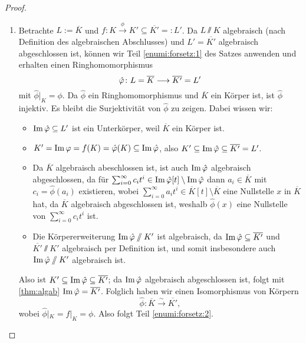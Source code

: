 \documentclass[12pt,a4paper]{scrartcl}
\begin{document}
\begin{proof}
\begin{enumerate}
\begin{itemize}
\begin{proof}[Beweis der Behauptung]
\begin{itemize}
					Also ist $(M_{\max}, \ev_{a'}\circ \beta)\in Z$, da $\ev_{a'}\circ \beta\colon M_{\max}(a)\to L'$ offensichtlich ein Ringhomomorphismus mit $(\ev_{a'}\circ \beta)|_K = \ev_{a'}|_K = f$ nach Konstruktion ist. Das ist ein Widerspruch zur Maximalität von $(M_{\max}, g_{\max})$. Damit folgt die Behauptung und insgesamt Teil \ref{enumi:forsetz:1} des Satzes.
        \qedhere
				\end{itemize}
			\end{proof}
		\end{itemize}
		\item Betrachte $L := \overline{K}$ und $f\colon K\xrightarrow{\phi} K'\subseteq \overline{K'} =: L'$. Da $L\sslash K$ algebraisch (nach Definition des algebraischen Abschlusses) und $L' = \overline{K'}$ algebraisch abgeschlossen ist, können wir Teil \ref{enumi:forsetz:1} des Satzes anwenden und erhalten einen Ringhomomorphismus
		\[\hat{\varphi}\colon L = \overline{K}\longrightarrow \overline{K'} = L'\]
		mit $\hat{\phi}|_K = \phi$. Da $\hat\phi$ ein Ringhomomorphismus und $\overline{K}$ ein Körper ist, ist $\hat\phi$ injektiv. Es bleibt die Surjektivität von $\hat{\phi}$ zu zeigen. Dabei wissen wir:
		\begin{itemize}
			\item $\operatorname{Im}\hat{\varphi} \subseteq L'$ ist ein Unterkörper, weil $\overline{K}$ ein Körper ist.
			\item $K' = \operatorname{Im}\varphi = f(K) = \hat{\varphi}(K)\subseteq \operatorname{Im}\hat{\varphi}$, also $K'\subseteq \operatorname{Im}\hat{\varphi}\subseteq \overline{K'} = L'$.
			\item Da $\overline{K}$ algebraisch abeschlossen ist, ist auch $\operatorname{Im} \hat{\varphi}$ algebraisch abgeschlossen, da für $\sum_{i = 0}^{\infty}c_it^i\in \operatorname{Im} \hat{\varphi}[t]\setminus \operatorname{Im}\hat{\varphi}$ dann $a_i\in \overline{K}$ mit $c_i = \hat{\phi}(a_i)$ existieren, wobei $\sum_{i = 0}^{\infty} a_it^i\in \overline{K}[t]\setminus \overline{K}$ eine Nullstelle $x$ in $\overline{K}$ hat, da $\overline{K}$ algebraisch abgeschlossen ist, weshalb $\hat{\phi}(x)$ eine Nullstelle von $\sum_{i = 0}^{\infty}c_it^i$ ist.
			\item Die Körpererweiterung $\operatorname{Im}\hat{\varphi}\sslash K'$ ist algebraisch, da $\operatorname{Im}\hat{\varphi}\subseteq\overline{K'}$ und $\overline{K'}\sslash K'$ algebraisch per Definition ist, und somit insbesondere auch $\operatorname{Im}\hat{\varphi}\sslash K'$ algebraisch ist.
		\end{itemize} 
		Also ist $K'\subseteq  \operatorname{Im}\hat {\varphi}\subseteq \overline{K'}$; da $\operatorname{Im}\hat{\varphi}$ algebraisch abgeschlossen ist, folgt mit \cref{thm:algab} $\operatorname{Im}\hat{\varphi} = \overline{K'}$. Folglich haben wir einen Isomorphismus von Körpern
		\[\hat{\phi}\colon \overline{K}\xrightarrow{\sim} \overline{K'},\]
		wobei $\hat{\phi}|_K = f|_K = \phi$. Also folgt Teil \ref{enumi:forsetz:2}.
  \qedhere
	\end{enumerate}
\end{proof}
\end{document}
